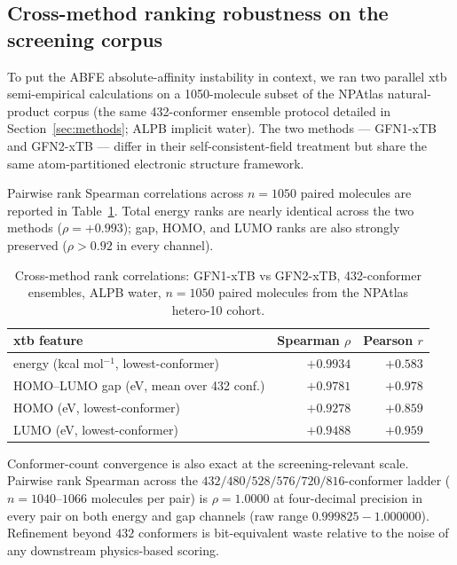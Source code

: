 \documentclass[11pt,a4paper]{article}
\begin{document}
\subsection{Cross-method ranking robustness on the screening corpus}
\label{sec:results-xtb}

To put the ABFE absolute-affinity instability in context, we ran two
parallel xtb semi-empirical calculations on a 1050-molecule subset of
the NPAtlas natural-product corpus (the same 432-conformer ensemble
protocol detailed in Section~\ref{sec:methods}; ALPB implicit water).
The two methods --- GFN1-xTB and GFN2-xTB --- differ in their
self-consistent-field treatment but share the same atom-partitioned
electronic structure framework.

Pairwise rank Spearman correlations across $n = 1050$ paired molecules
are reported in Table~\ref{tab:xtb-cross}. Total energy ranks are
nearly identical across the two methods
($\rho = +0.993$); gap, HOMO, and LUMO ranks are also strongly
preserved ($\rho > 0.92$ in every channel).

\begin{table}[ht]
\centering
\caption{Cross-method rank correlations: GFN1-xTB vs GFN2-xTB,
432-conformer ensembles, ALPB water, $n = 1050$ paired molecules from
the NPAtlas hetero-10 cohort.}
\label{tab:xtb-cross}
\small
\begin{tabular}{lrr}
\toprule
xtb feature & Spearman $\rho$ & Pearson $r$ \\
\midrule
energy (kcal mol$^{-1}$, lowest-conformer) & $+0.9934$ & $+0.583$ \\
HOMO--LUMO gap (eV, mean over 432 conf.)   & $+0.9781$ & $+0.978$ \\
HOMO (eV, lowest-conformer)                & $+0.9278$ & $+0.859$ \\
LUMO (eV, lowest-conformer)                & $+0.9488$ & $+0.959$ \\
\bottomrule
\end{tabular}
\end{table}

Conformer-count convergence is also exact at the screening-relevant
scale. Pairwise rank Spearman across the
$432/480/528/576/720/816$-conformer ladder ($n = 1040\textrm{--}1066$
molecules per pair) is $\rho = 1.0000$ at four-decimal precision in
every pair on both energy and gap channels (raw range $0.999825 -
1.000000$). Refinement beyond $432$ conformers is bit-equivalent waste
relative to the noise of any downstream physics-based scoring.
\end{document}
